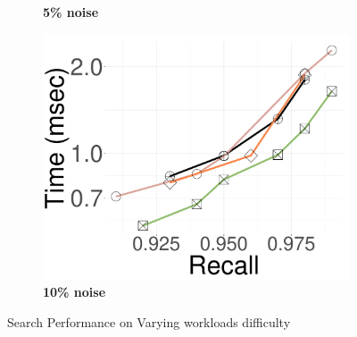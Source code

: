 \begin{figure}[!htb]
\begin{subfigure}{\soneM\textwidth}
		\caption{\textbf{5\% noise}} 
		\label{fig:search:query:performance:25GB:hard:1p}
		\end{subfigure}
    \hspace{0.4cm}
		\begin{subfigure}{\soneM\textwidth}
  \centering
		\includegraphics[width=\textwidth]{../img/Experiments/search/25/deep10p_10nn.pdf}
		\caption{\textbf{10\% noise}} 
		\label{fig:search:query:performance:25GB:hard:10p}
		\end{subfigure}
	\caption{Search Performance on Varying workloads difficulty}
		\label{fig:search:query:performance:25GB:hard}
	\end{figure}

